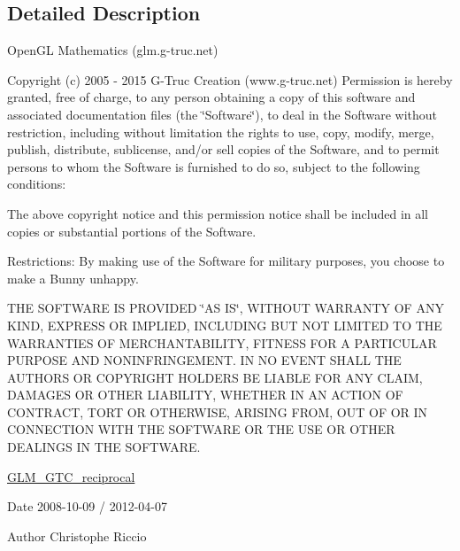 \subsection{Detailed Description}
Open\-G\-L Mathematics (glm.\-g-\/truc.\-net)

Copyright (c) 2005 -\/ 2015 G-\/\-Truc Creation (www.\-g-\/truc.\-net) Permission is hereby granted, free of charge, to any person obtaining a copy of this software and associated documentation files (the \char`\"{}\-Software\char`\"{}), to deal in the Software without restriction, including without limitation the rights to use, copy, modify, merge, publish, distribute, sublicense, and/or sell copies of the Software, and to permit persons to whom the Software is furnished to do so, subject to the following conditions\-:

The above copyright notice and this permission notice shall be included in all copies or substantial portions of the Software.

Restrictions\-: By making use of the Software for military purposes, you choose to make a Bunny unhappy.

T\-H\-E S\-O\-F\-T\-W\-A\-R\-E I\-S P\-R\-O\-V\-I\-D\-E\-D \char`\"{}\-A\-S I\-S\char`\"{}, W\-I\-T\-H\-O\-U\-T W\-A\-R\-R\-A\-N\-T\-Y O\-F A\-N\-Y K\-I\-N\-D, E\-X\-P\-R\-E\-S\-S O\-R I\-M\-P\-L\-I\-E\-D, I\-N\-C\-L\-U\-D\-I\-N\-G B\-U\-T N\-O\-T L\-I\-M\-I\-T\-E\-D T\-O T\-H\-E W\-A\-R\-R\-A\-N\-T\-I\-E\-S O\-F M\-E\-R\-C\-H\-A\-N\-T\-A\-B\-I\-L\-I\-T\-Y, F\-I\-T\-N\-E\-S\-S F\-O\-R A P\-A\-R\-T\-I\-C\-U\-L\-A\-R P\-U\-R\-P\-O\-S\-E A\-N\-D N\-O\-N\-I\-N\-F\-R\-I\-N\-G\-E\-M\-E\-N\-T. I\-N N\-O E\-V\-E\-N\-T S\-H\-A\-L\-L T\-H\-E A\-U\-T\-H\-O\-R\-S O\-R C\-O\-P\-Y\-R\-I\-G\-H\-T H\-O\-L\-D\-E\-R\-S B\-E L\-I\-A\-B\-L\-E F\-O\-R A\-N\-Y C\-L\-A\-I\-M, D\-A\-M\-A\-G\-E\-S O\-R O\-T\-H\-E\-R L\-I\-A\-B\-I\-L\-I\-T\-Y, W\-H\-E\-T\-H\-E\-R I\-N A\-N A\-C\-T\-I\-O\-N O\-F C\-O\-N\-T\-R\-A\-C\-T, T\-O\-R\-T O\-R O\-T\-H\-E\-R\-W\-I\-S\-E, A\-R\-I\-S\-I\-N\-G F\-R\-O\-M, O\-U\-T O\-F O\-R I\-N C\-O\-N\-N\-E\-C\-T\-I\-O\-N W\-I\-T\-H T\-H\-E S\-O\-F\-T\-W\-A\-R\-E O\-R T\-H\-E U\-S\-E O\-R O\-T\-H\-E\-R D\-E\-A\-L\-I\-N\-G\-S I\-N T\-H\-E S\-O\-F\-T\-W\-A\-R\-E.

\hyperlink{group__gtc__reciprocal}{G\-L\-M\-\_\-\-G\-T\-C\-\_\-reciprocal}

\begin{DoxyDate}{Date}
2008-\/10-\/09 / 2012-\/04-\/07 
\end{DoxyDate}
\begin{DoxyAuthor}{Author}
Christophe Riccio 
\end{DoxyAuthor}
